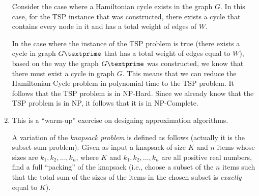\documentclass[paper=a4, fontsize=11pt]{scrartcl} %
\numberwithin{equation}{section} %
\numberwithin{figure}{section} %
\numberwithin{table}{section} %
\begin{document}
\begin{enumerate}
Consider the case where a Hamiltonian cycle exists in the graph $G$. In this case, for the TSP instance that was constructed, there exists a cycle that contains every node in it and has a total weight of edges of $W$.

In the case where the instance of the TSP problem is true (there exists a cycle in graph $G\textprime$ that has a total weight of edges equal to $W$), based on the way the graph $G\textprime$ was constructed, we know that there must exist a cycle in graph $G$. This means that we can reduce the Hamiltonian Cycle problem in polynomial time to the TSP problem. It follows that the TSP problem is in NP-Hard. Since we already know that the TSP problem is in NP, it follows that it is in NP-Complete.

\item This is a \enquote{warm-up} exercise on designing approximation algorithms.

A variation of the \emph{knapsack problem} is defined as follows (actually it is the subset-sum problem): Given as input a knapsack of size $K$ and $n$ items whose sizes are $k_1, k_2, \ldots , k_n$, where $K$ and $k_1, k_2, \ldots , k_n$ are all positive real numbers, find a full \enquote{packing} of the knapsack (i.e., choose a subset of the $n$ items such that the total sum of the sizes of the items in the chosen subset is \emph{exactly} equal to $K$).


\end{enumerate}
\end{document}
